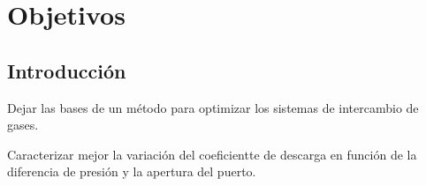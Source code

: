 
\chapter{Objetivos}
\label{capitulo2}
\section{Introducción}

Dejar las bases de un método para optimizar los sistemas de intercambio
de gases.

Caracterizar mejor la variación del coeficientte de descarga en función de la
diferencia de presión y la apertura del puerto.

